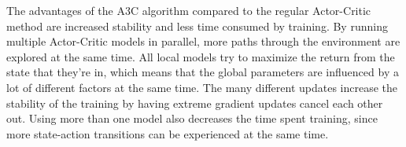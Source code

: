 \documentclass[11pt]{article}
\begin{document}
The advantages of the A3C algorithm compared to the regular Actor-Critic method
are increased stability and less time consumed by training.
By running multiple Actor-Critic models in parallel, more paths through the environment are explored
at the same time.
All local models try to maximize the return from the state that they're in, which means that
the global parameters are influenced by a lot of different factors at the same time.
The many different updates increase the stability of the training by having
extreme gradient updates cancel each other out.
Using more than one model also decreases the time spent training, since
more state-action transitions can be experienced at the same time.
\end{document}
